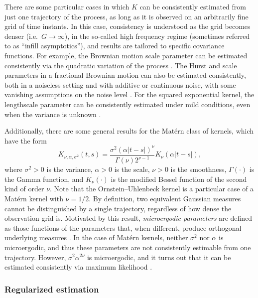 There are some particular cases in which \(K\) can be consistently estimated from just one trajectory of the process, as long as it is observed on an arbitrarily fine grid of time instants. In this case, consistency is understood as the grid becomes denser (i.e.\ \(G\to\infty\)), in the so-called high frequency regime (sometimes referred to as ``infill asymptotics''), and results are tailored to specific covariance functions. For example, the Brownian motion scale parameter can be estimated consistently via the quadratic variation of the process \citep{miao2006estimation}. The Hurst and scale parameters in a fractional Brownian motion can also be estimated consistently, both in a noiseless setting \citep{coeurjolly2001estimating, brouste2018local} and with additive or continuous noise, with some vanishing assumptions on the noise level \citep{szymanski2024optimal, chigansky2023estimation, dozzi2015asymptotic}. For the squared exponential kernel, the lengthscale parameter can be consistently estimated under mild conditions, even when the variance is unknown \citep{loh2000estimating}.

Additionally, there are some general results for the Matérn class of kernels, which have the form
\[
K_{\nu,\alpha, \sigma^2}(t,s) = \frac{\sigma^2(\alpha|t-s|)^\nu}{\Gamma(\nu)2^{\nu-1}}K_\nu(\alpha|t-s|), 
\]
where \(\sigma^2>0\) is the variance, \(\alpha>0\) is the scale, \(\nu>0\) is the smoothness, \(\Gamma(\cdot)\) is the Gamma function, and \(K_\nu(\cdot)\) is the modified Bessel function of the second kind of order \(\nu\). Note that the Ornstein--Uhlenbeck kernel is a particular case of a Matérn kernel with \(\nu=1/2\). By definition, two equivalent Gaussian measures cannot be distinguished by a single trajectory, regardless of how dense the observation grid is. Motivated by this result, \textit{microergodic parameters} are defined as those functions of the parameters that, when different, produce orthogonal underlying measures \citep[see][Section~4]{bachoc2021asymptotic}. In the case of Matérn kernels, neither \(\sigma^2\) nor \(\alpha\) is microergodic, and thus these parameters are not consistently estimable from one trajectory. However, \(\sigma^2\alpha^{2\nu}\) is microergodic, and it turns out that it can be estimated consistently via maximum likelihood \citep{zhang2004inconsistent}.

\subsubsection*{Regularized estimation}

